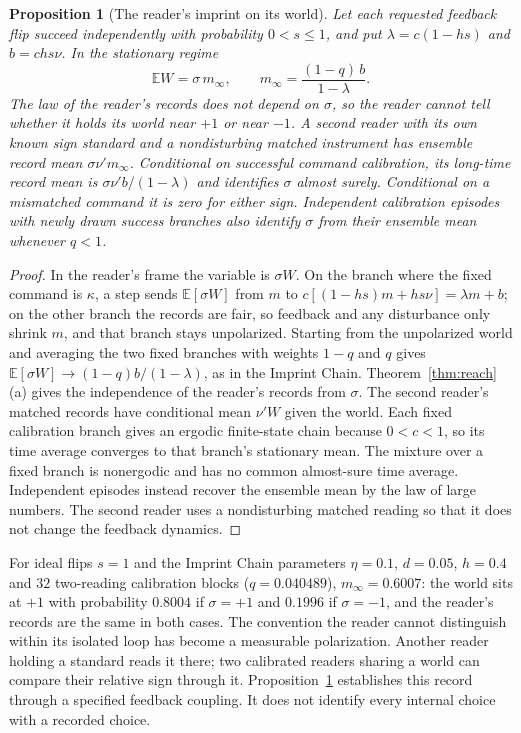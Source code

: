 \documentclass[11pt,a4paper]{article}
\newtheorem{proposition}[definition]{Proposition}
\newcommand{\E}{\mathbb E}
\begin{document}
\begin{proposition}[The reader's imprint on its world]\label{prop:imprint}
Let each requested feedback flip succeed independently with probability $0<s\le1$, and put $\lambda=c(1-hs)$ and $b=chs\nu$. In the stationary regime
\[
 \E W=\sigma\,m_\infty,\qquad m_\infty=\frac{(1-q)\,b}{1-\lambda}.
\]
The law of the reader's records does not depend on $\sigma$, so the reader cannot tell whether it holds its world near $+1$ or near $-1$. A second reader with its own known sign standard and a nondisturbing matched instrument has ensemble record mean $\sigma\nu'm_\infty$. Conditional on successful command calibration, its long-time record mean is $\sigma\nu'b/(1-\lambda)$ and identifies $\sigma$ almost surely. Conditional on a mismatched command it is zero for either sign. Independent calibration episodes with newly drawn success branches also identify $\sigma$ from their ensemble mean whenever $q<1$.
\end{proposition}
\begin{proof}
In the reader's frame the variable is $\sigma W$. On the branch where the fixed command is $\kappa$, a step sends $\E[\sigma W]$ from $m$ to $c[(1-hs)m+hs\nu]=\lambda m+b$; on the other branch the records are fair, so feedback and any disturbance only shrink $m$, and that branch stays unpolarized. Starting from the unpolarized world and averaging the two fixed branches with weights $1-q$ and $q$ gives $\E[\sigma W]\to(1-q)b/(1-\lambda)$, as in the Imprint Chain. Theorem~\ref{thm:reach}(a) gives the independence of the reader's records from $\sigma$. The second reader's matched records have conditional mean $\nu'W$ given the world. Each fixed calibration branch gives an ergodic finite-state chain because $0<c<1$, so its time average converges to that branch's stationary mean. The mixture over a fixed branch is nonergodic and has no common almost-sure time average. Independent episodes instead recover the ensemble mean by the law of large numbers. The second reader uses a nondisturbing matched reading so that it does not change the feedback dynamics.
\end{proof}

For ideal flips $s=1$ and the Imprint Chain parameters $\eta=0.1$, $d=0.05$, $h=0.4$ and $32$ two-reading calibration blocks ($q=0.040489$), $m_\infty=0.6007$: the world sits at $+1$ with probability $0.8004$ if $\sigma=+1$ and $0.1996$ if $\sigma=-1$, and the reader's records are the same in both cases. The convention the reader cannot distinguish within its isolated loop has become a measurable polarization. Another reader holding a standard reads it there; two calibrated readers sharing a world can compare their relative sign through it. Proposition~\ref{prop:imprint} establishes this record through a specified feedback coupling. It does not identify every internal choice with a recorded choice.
\end{document}
